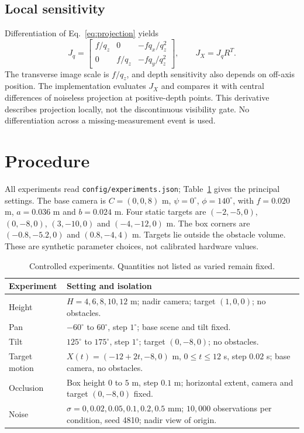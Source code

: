 \documentclass[11pt,letterpaper]{article}
\begin{document}
\subsection{Local sensitivity}
Differentiation of Eq.~\eqref{eq:projection} yields
\begin{equation}
J_q=\begin{bmatrix}
f/q_z&0&-fq_x/q_z^2\\0&f/q_z&-fq_y/q_z^2
\end{bmatrix},\qquad J_X=J_qR^T.
\label{eq:jac}
\end{equation}
The transverse image scale is $f/q_z$, and depth sensitivity also depends on off-axis position. The implementation evaluates $J_X$ and compares it with central differences of noiseless projection at positive-depth points. This derivative describes projection locally, not the discontinuous visibility gate. No differentiation across a missing-measurement event is used.

\section{Procedure}
All experiments read \texttt{config/experiments.json}; Table~\ref{tab:config} gives the principal settings. The base camera is $C=(0,0,8)$ m, $\psi=0^\circ$, $\phi=140^\circ$, with $f=0.020$ m, $a=0.036$ m and $b=0.024$ m. Four static targets are $(-2,-5,0)$, $(0,-8,0)$, $(3,-10,0)$ and $(-4,-12,0)$ m. The box corners are $(-0.8,-5.2,0)$ and $(0.8,-4,4)$ m. Targets lie outside the obstacle volume. These are synthetic parameter choices, not calibrated hardware values.

\begin{table}[htbp]
\centering\small
\caption{Controlled experiments. Quantities not listed as varied remain fixed.}
\label{tab:config}
\begin{tabular}{p{.18\linewidth}p{.72\linewidth}}\toprule
Experiment & Setting and isolation\\\midrule
Height & $H=4,6,8,10,12$ m; nadir camera; target $(1,0,0)$; no obstacles.\\
Pan & $-60^\circ$ to $60^\circ$, step $1^\circ$; base scene and tilt fixed.\\
Tilt & $125^\circ$ to $175^\circ$, step $1^\circ$; target $(0,-8,0)$; no obstacles.\\
Target motion & $X(t)=(-12+2t,-8,0)$ m, $0\le t\le12$ s, step $0.02$ s; base camera, no obstacles.\\
Occlusion & Box height $0$ to $5$ m, step $0.1$ m; horizontal extent, camera and target $(0,-8,0)$ fixed.\\
Noise & $\sigma=0,0.02,0.05,0.1,0.2,0.5$ mm; $10{,}000$ observations per condition, seed 4810; nadir view of origin.\\\bottomrule
\end{tabular}
\end{table}
\end{document}
